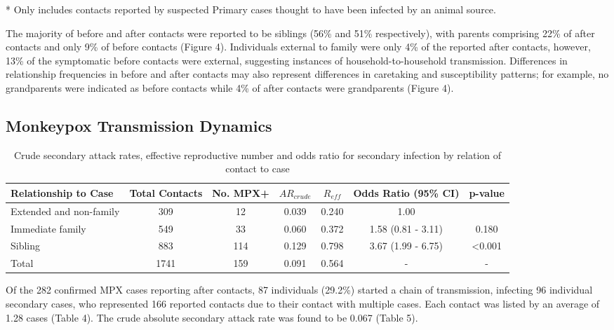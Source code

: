 * Only includes contacts reported by suspected Primary cases thought to have been infected by an animal source.


The majority of before and after contacts were reported to be siblings (56\% and 51\% respectively), with parents comprising 22\% of after contacts and only 9\% of before contacts (Figure 4). Individuals external to family were only 4\% of the reported after contacts, however, 13\% of the symptomatic before contacts were external, suggesting instances of household-to-household transmission. Differences in relationship frequencies in before and after contacts may also represent differences in caretaking and susceptibility patterns; for example, no grandparents were indicated as before contacts while 4\% of after contacts were grandparents (Figure 4).

\subsection{Monkeypox Transmission Dynamics}

\begin{table}
\centering
    \caption{Crude secondary attack rates, effective reproductive number and odds ratio for secondary infection by relation of contact to case}
    \begin{tabular}{@{}lcccccc@{}}
    \toprule
    Relationship to Case & Total Contacts  & No. MPX+ & $AR_{crude}$ & $R_{eff}$ & Odds Ratio (95\% CI)  & p-value \\
    \midrule
  Extended and non-family   &  309   &   12   & 0.039 & 0.240 & 1.00               &  ~ \\
  Immediate family  &  549   &   33   & 0.060 & 0.372 & 1.58 (0.81 - 3.11) & 0.180 \\
  Sibling           &  883   &   114  & 0.129 & 0.798 & 3.67 (1.99 - 6.75) & \textless0.001 \\
  \midrule
  Total             &  1741  &   159  & 0.091 & 0.564 & -                & - \\
    \bottomrule
    \end{tabular}
\end{table}

Of the 282 confirmed MPX cases reporting after contacts, 87 individuals (29.2\%) started a chain of transmission, infecting 96 individual secondary cases, who represented 166 reported contacts due to their contact with multiple cases. Each contact was listed by an average of 1.28 cases (Table 4). The crude absolute secondary attack rate was found to be 0.067 (Table 5).



